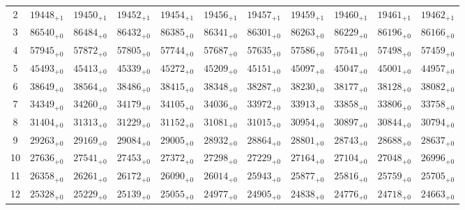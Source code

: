 \documentclass[10pt, a4paper]{article}
\begin{document}
\begin{center}
\begin{tabular}{c || c c c c c | c c c c c}
        2 & \({19448}_{+1}\) & \({19450}_{+1}\) & \({19452}_{+1}\) & \({19454}_{+1}\) & \({19456}_{+1}\) & \({19457}_{+1}\) & \({19459}_{+1}\) & \({19460}_{+1}\) & \({19461}_{+1}\) & \({19462}_{+1}\)\\
        3 & \({86540}_{+0}\) & \({86484}_{+0}\) & \({86432}_{+0}\) & \({86385}_{+0}\) & \({86341}_{+0}\) & \({86301}_{+0}\) & \({86263}_{+0}\) & \({86229}_{+0}\) & \({86196}_{+0}\) & \({86166}_{+0}\)\\
        4 & \({57945}_{+0}\) & \({57872}_{+0}\) & \({57805}_{+0}\) & \({57744}_{+0}\) & \({57687}_{+0}\) & \({57635}_{+0}\) & \({57586}_{+0}\) & \({57541}_{+0}\) & \({57498}_{+0}\) & \({57459}_{+0}\)\\
        5 & \({45493}_{+0}\) & \({45413}_{+0}\) & \({45339}_{+0}\) & \({45272}_{+0}\) & \({45209}_{+0}\) & \({45151}_{+0}\) & \({45097}_{+0}\) & \({45047}_{+0}\) & \({45001}_{+0}\) & \({44957}_{+0}\)\\
        \hline
        6 & \({38649}_{+0}\) & \({38564}_{+0}\) & \({38486}_{+0}\) & \({38415}_{+0}\) & \({38348}_{+0}\) & \({38287}_{+0}\) & \({38230}_{+0}\) & \({38177}_{+0}\) & \({38128}_{+0}\) & \({38082}_{+0}\)\\
        7 & \({34349}_{+0}\) & \({34260}_{+0}\) & \({34179}_{+0}\) & \({34105}_{+0}\) & \({34036}_{+0}\) & \({33972}_{+0}\) & \({33913}_{+0}\) & \({33858}_{+0}\) & \({33806}_{+0}\) & \({33758}_{+0}\)\\
        8 & \({31404}_{+0}\) & \({31313}_{+0}\) & \({31229}_{+0}\) & \({31152}_{+0}\) & \({31081}_{+0}\) & \({31015}_{+0}\) & \({30954}_{+0}\) & \({30897}_{+0}\) & \({30844}_{+0}\) & \({30794}_{+0}\)\\
        9 & \({29263}_{+0}\) & \({29169}_{+0}\) & \({29084}_{+0}\) & \({29005}_{+0}\) & \({28932}_{+0}\) & \({28864}_{+0}\) & \({28801}_{+0}\) & \({28743}_{+0}\) & \({28688}_{+0}\) & \({28637}_{+0}\)\\
        10 & \({27636}_{+0}\) & \({27541}_{+0}\) & \({27453}_{+0}\) & \({27372}_{+0}\) & \({27298}_{+0}\) & \({27229}_{+0}\) & \({27164}_{+0}\) & \({27104}_{+0}\) & \({27048}_{+0}\) & \({26996}_{+0}\)\\
        \hline
        11 & \({26358}_{+0}\) & \({26261}_{+0}\) & \({26172}_{+0}\) & \({26090}_{+0}\) & \({26014}_{+0}\) & \({25943}_{+0}\) & \({25877}_{+0}\) & \({25816}_{+0}\) & \({25759}_{+0}\) & \({25705}_{+0}\)\\
        12 & \({25328}_{+0}\) & \({25229}_{+0}\) & \({25139}_{+0}\) & \({25055}_{+0}\) & \({24977}_{+0}\) & \({24905}_{+0}\) & \({24838}_{+0}\) & \({24776}_{+0}\) & \({24718}_{+0}\) & \({24663}_{+0}\)\\

\end{tabular}
\end{center}
\end{document}
